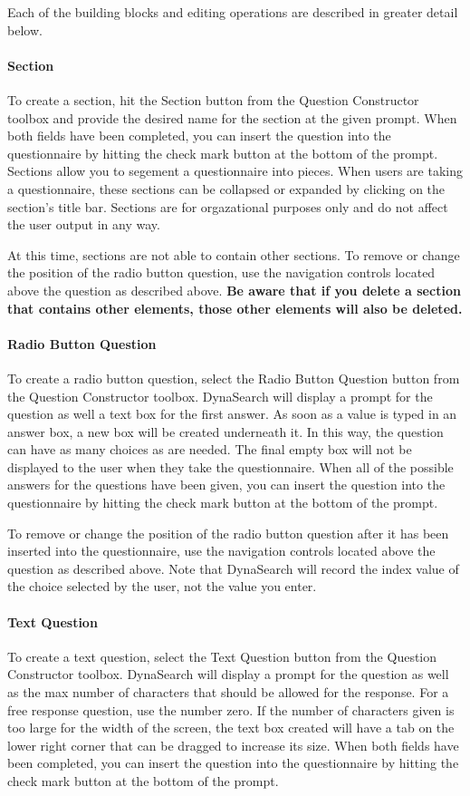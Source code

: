 \documentclass[article]{ij4uq}              %
\begin{document}
 Each of the building blocks and editing operations are described in greater detail below.

\paragraph{Section}
To create a section, hit the Section button from the Question Constructor toolbox and provide the desired name for the section at the given prompt.  When both fields have been completed, you can insert the question into the questionnaire by hitting the check mark button at the bottom of the prompt.  Sections allow you to segement a questionnaire into pieces.  When users are taking a questionnaire, these sections can be collapsed or expanded by clicking on the section's title bar.  Sections are for orgazational purposes only and do not affect the user output in any way.

At this time, sections are not able to contain other sections.  To remove or change the position of the radio button question, use the navigation controls located above the question as described above. \textbf{Be aware that if you delete a section that contains other elements, those other elements will also be deleted.}

\paragraph{Radio Button Question}
To create a radio button question, select the Radio Button Question button from the Question Constructor toolbox. DynaSearch will display a prompt for the question as well a text box for the first answer.  As soon as a value is typed in an answer box, a new box will be created underneath it.  In this way, the question can have as many choices as are needed.  The final empty box will not be displayed to the user when they take the questionnaire.  When all of the possible answers for the questions have been given, you can insert the question into the questionnaire by hitting the check mark button at the bottom of the prompt.

To remove or change the position of the radio button question after it has been inserted into the questionnaire, use the navigation controls located above the question as described above.  Note that DynaSearch will record the index value of the choice selected by the user, not the value you enter. 

\paragraph{Text Question}
To create a text question, select the Text Question button from the Question Constructor toolbox.  DynaSearch will display a prompt for the question as well as the max number of characters that should be allowed for the response.   For a free response question, use the number zero.  If the number of characters given is too large for the width of the screen, the text box created will have a tab on the lower right corner that can be dragged to increase its size.  When both fields have been completed, you can insert the question into the questionnaire by hitting the check mark button at the bottom of the prompt.
\end{document}
